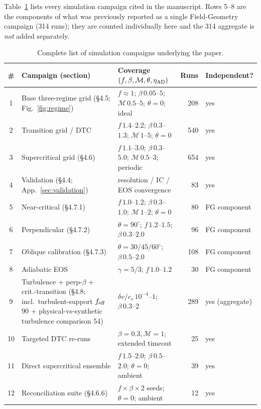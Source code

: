\documentclass[usenatbib,twoside,twocolumn]{mnras}
\begin{document}
Table~\ref{tab:campaigns} lists every simulation campaign cited in the manuscript. Rows 5--8 are the components of what was previously reported as a single Field-Geometry campaign (314 runs); they are counted individually here and the 314 aggregate is \emph{not} added separately.

\begin{table}
\caption{Complete list of simulation campaigns underlying the paper.}
\label{tab:campaigns}
\begin{tabular}{cllrl}
\toprule
\# & Campaign (section) & Coverage $(f,\beta,\mathcal{M},\theta,\eta_{\rm AD})$ & Runs & Independent? \\
\midrule
1  & Base three-regime grid (\S4.5; Fig.~\ref{fig:regime}) & $f\approx1$; $\beta\,0.05$--$5$; $\mathcal{M}\,0.5$--$5$; $\theta=0$; ideal & 208 & yes \\
2  & Transition grid / DTC & $f\,1.4$--$2.2$; $\beta\,0.3$--$1.3$; $\mathcal{M}\,1$--$5$; $\theta=0$ & 540 & yes \\
3  & Supercritical grid (\S4.6) & $f\,1.1$--$3.0$; $\beta\,0.3$--$5.0$; $\mathcal{M}\,0.5$--$3$; periodic & 654 & yes \\
4  & Validation (\S4.4; App.~\ref{sec:validation}) & resolution / IC / EOS convergence & 83 & yes \\
5  & Near-critical (\S4.7.1) & $f\,1.0$--$1.2$; $\beta\,0.3$--$1.0$; $\mathcal{M}\,1$--$2$; $\theta=0$ & 80 & FG component \\
6  & Perpendicular (\S4.7.2) & $\theta=90^\circ$; $f\,1.2$--$1.5$; $\beta\,0.3$--$2.0$ & 96 & FG component \\
7  & Oblique calibration (\S4.7.3) & $\theta=30/45/60^\circ$; $\beta\,0.5$--$2.0$ & 108 & FG component \\
8  & Adiabatic EOS & $\gamma=5/3$; $f\,1.0$--$1.2$ & 30 & FG component \\
9  & Turbulence + perp-$\beta$ + crit.-transition (\S4.8; incl.\ turbulent-support $f_{\rm eff}$ 90 + physical-vs-synthetic turbulence comparison 54) & $\delta v/c_s\,10^{-4}$--$1$; $\beta\,0.3$--$2$ & 289 & yes (aggregate) \\
10 & Targeted DTC re-runs & $\beta=0.3,\mathcal{M}=1$; extended timeout & 25 & yes \\
11 & Direct supercritical ensemble & $f\,1.5$--$2.0$; $\beta\,0.5$--$2.0$; $\theta=0$; ambient & 39 & yes \\
12 & Reconciliation suite (\S4.6.6) & $f\times\beta\times2$ seeds; $\theta=0$; ambient & 12 & yes \\

\end{tabular}
\end{table}
\end{document}

